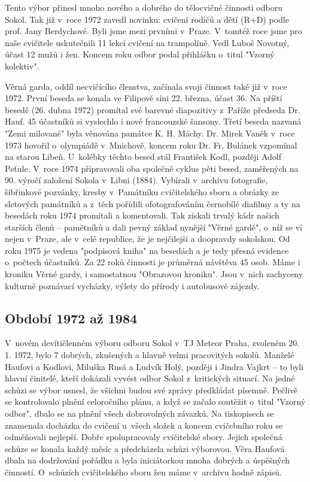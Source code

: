 \documentclass[a5paper, 12pt, twoside]{article}
\begin{document}
Tento výbor přinesl mnoho nového a dobrého do tělocvičné činnosti odboru
Sokol. Tak již v~roce 1972 zavedl novinku: cvičení rodičů a dětí (R+D)
podle prof. Jany Berdychové. Byli jsme mezi prvními v~Praze. V~tomtéž
roce jsme pro naše cvičitele uskutečnili 11 lekcí cvičení na trampolíně.
Vedl Luboš Novotný, účast 12 mužů i žen. Koncem roku odbor podal
přihlášku o~titul "Vzorný kolektiv".

Věrná garda, oddíl necvičícího členstva, začínala svoji činnost také již
v~roce 1972. První beseda se konala ve Filipově síni 22. března, účast
36. Na příští besedě (26. dubna 1972) promítal své barevné diapozitivy
z~Paříže předseda Dr. Hauf. 45 účastníků si vyslechlo i nové francouzské
šansony. Třetí beseda nazvaná "Zemi milované" byla věnována památce K.
H. Máchy. Dr. Mirek Vaněk v~roce 1973 hovořil o~olympiádě v~Mnichově,
koncem roku Dr. Fr. Bulánek vzpomínal na starou Libeň. U~kolébky těchto
besed stál František Kodl, později Adolf Peťule. V~roce 1974
připravovali oba společně cyklus pěti besed, zaměřených na 90. výročí
založení Sokola v~Libni (1884). Vybírali v~archivu fotografie,
šibřinkové pozvánky, kresby v~Památníku cvičitelského sboru a obrázky ze
sletových památníků a z~těch pořídili ofotografováním černobílé diafilmy
a ty na besedách roku 1974 promítali a komentovali. Tak získali trvalý
kádr našich starších členů -- pamětníků a dali pevný základ nynější
"Věrné gardě", o~níž se ví nejen v~Praze, ale v~celé republice, že je
nejčilejší a doopravdy sokolskou. Od roku 1975 je vedena "podpisová
kniha" na besedách a je tedy přesná evidence o~počtech účastníků. Za 22
roků činnosti je průměrná návštěva 45 osob. Máme i kroniku Věrné gardy,
i samostatnou "Obrazovou kroniku". Jsou v~nich zachyceny kulturně
poznávací vycházky, výlety do přírody i autobusové zájezdy.

\subsection{Období 1972 až 1984}

V~novém devítičlenném výboru odboru Sokol v~TJ Meteor Praha, zvoleném
20. 1. 1972, bylo 7 dobrých, zkušených a hlavně velmi pracovitých
sokolů. Manželé Haufovi a Kodlovi, Miluška Rusá a Ludvík Holý, později i
Jindra Vajkrt -- to byli hlavní činitelé, kteří dokázali vyvést odbor
Sokol z~kritických situací. Na jedné schůzi se výbor usnesl, že všichni
budou své zprávy předkládat písemně. Pečlivě se kontrolovalo plnění
celoročního plánu, a když se začalo soutěžit o~titul "Vzorný odbor",
dbalo se na plnění všech dobrovolných závazků. Na tiskopisech se
znamenala docházka do cvičení u~všech složek a koncem cvičebního roku se
odměňovali nejlepší. Dobře spolupracovaly cvičitelské sbory. Jejich
společná schůze se konala každý měsíc a předcházela schůzi výborovou.
Věra Haufová dbala na dodržování pořádku a byla iniciátorkou mnoha
dobrých a úspěšných činností. O~schůzích cvičitelského sboru žen máme
v~archivu hodně zápisů.
\end{document}
